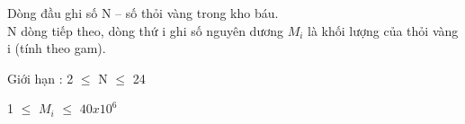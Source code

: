Dòng đầu ghi số N – số thỏi vàng trong kho báu.
\\N dòng tiếp theo, dòng thứ i ghi số nguyên dương $M_{i}$ là khối lượng của thỏi vàng i (tính theo gam).

Giới hạn : 2  $\le$  N  $\le$  24

1  $\le$  $M_{i}$  $\le$  $40x10^{6}$